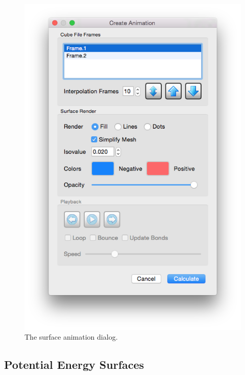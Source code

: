 \documentclass[a4paper,12pt]{article}
\begin{document}
\begin{figure}[h]
\begin{center}
\includegraphics[scale=0.20]{figures/AnimationDialog.png}
\end{center}
\caption{The surface animation dialog.}
\label{fig:SurfaceAnimationDialog}
\end{figure}



\newpage
\subsection{Potential Energy Surfaces}
\end{document}
